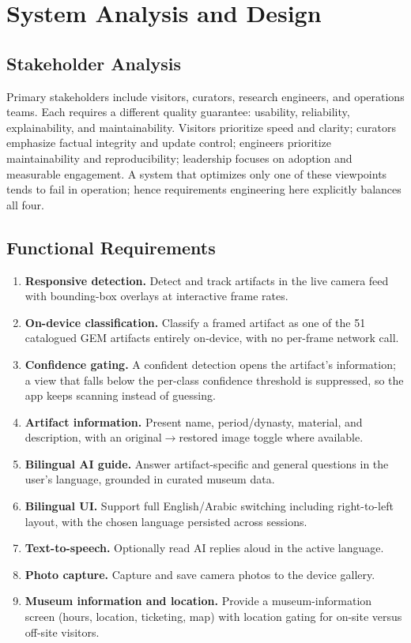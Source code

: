 \chapter{System Analysis and Design}

\section{Stakeholder Analysis}

Primary stakeholders include visitors, curators, research engineers, and operations
teams. Each requires a different quality guarantee: usability, reliability,
explainability, and maintainability. Visitors prioritize speed and clarity; curators
emphasize factual integrity and update control; engineers prioritize maintainability
and reproducibility; leadership focuses on adoption and measurable engagement. A
system that optimizes only one of these viewpoints tends to fail in operation; hence
requirements engineering here explicitly balances all four.

\section{Functional Requirements}

\begin{enumerate}[label=\textbf{FR-\arabic*.},leftmargin=3em]
  \item \textbf{Responsive detection.} Detect and track artifacts in the live camera
        feed with bounding-box overlays at interactive frame rates.
  \item \textbf{On-device classification.} Classify a framed artifact as one of the
        51 catalogued GEM artifacts entirely on-device, with no per-frame network call.
  \item \textbf{Confidence gating.} A confident detection opens the artifact's
        information; a view that falls below the per-class confidence threshold is
        suppressed, so the app keeps scanning instead of guessing.
  \item \textbf{Artifact information.} Present name, period/dynasty, material, and
        description, with an original$\rightarrow$restored image toggle where available.
  \item \textbf{Bilingual AI guide.} Answer artifact-specific and general questions in
        the user's language, grounded in curated museum data.
  \item \textbf{Bilingual UI.} Support full English/Arabic switching including
        right-to-left layout, with the chosen language persisted across sessions.
  \item \textbf{Text-to-speech.} Optionally read AI replies aloud in the active language.
  \item \textbf{Photo capture.} Capture and save camera photos to the device gallery.
  \item \textbf{Museum information and location.} Provide a museum-information screen
        (hours, location, ticketing, map) with location gating for on-site versus
        off-site visitors.
\end{enumerate}

